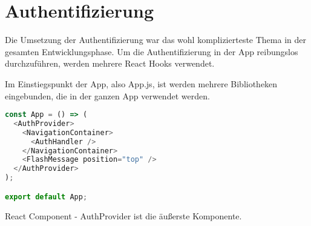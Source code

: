 \chapter{Authentifizierung}
Die Umsetzung der Authentifizierung war das wohl komplizierteste Thema in der gesamten
Entwicklungsphase. Um die Authentifizierung in der App reibungslos durchzuführen, werden mehrere
React Hooks verwendet.

Im Einstiegspunkt der App, also App.js, ist werden mehrere Bibliotheken eingebunden, die in der
ganzen App verwendet werden.

\begin{code}[htp]
\begin{lstlisting}[firstnumber=1,language=JavaScript, style=JSX]
const App = () => (
  <AuthProvider>
    <NavigationContainer>
      <AuthHandler />
    </NavigationContainer>
    <FlashMessage position="top" />
  </AuthProvider>
);

export default App;
\end{lstlisting}
\caption{React Component - AuthProvider ist die äußerste Komponente.}
\end{code}

\newpage


\newpage




